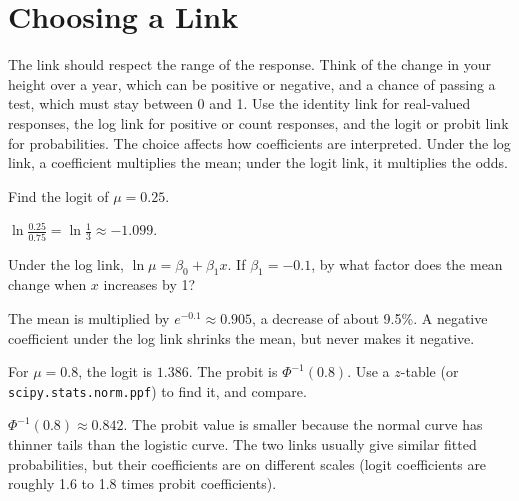 \section{Choosing a Link}
The link should respect the range of the response. Think of the change in your height over a year, which can be positive or negative, and a chance of passing a test, which must stay between 0 and 1. Use the identity link for real-valued responses, the log link for
positive or count responses, and the logit or probit link for probabilities. The choice affects how coefficients are
interpreted. Under the log link, a coefficient multiplies the mean; under the logit link, it multiplies the odds.

\begin{Exercise}[label=lf1, title=Logit value]
Find the logit of $\mu = 0.25$.
\end{Exercise}
\begin{Answer}[ref=lf1]
$\ln\frac{0.25}{0.75} = \ln\frac{1}{3} \approx -1.099$.
\end{Answer}

\begin{Exercise}[label=lf2, title=Interpret the log link]
Under the log link, $\ln\mu = \beta_0 + \beta_1 x$. If $\beta_1 = -0.1$, by what factor does the mean change when $x$ increases by 1?
\end{Exercise}
\begin{Answer}[ref=lf2]
The mean is multiplied by $e^{-0.1} \approx 0.905$, a decrease of about 9.5\%. A
negative coefficient under the log link shrinks the mean, but never makes it negative.
\end{Answer}

\begin{Exercise}[label=lf3, title=Logit versus probit]
For $\mu = 0.8$, the logit is $1.386$. The probit is $\Phi^{-1}(0.8)$. Use a
$z$-table (or \texttt{scipy.stats.norm.ppf}) to find it, and compare.
\end{Exercise}
\begin{Answer}[ref=lf3]
$\Phi^{-1}(0.8) \approx 0.842$. The probit value is smaller because the normal
curve has thinner tails than the logistic curve. The two links usually give
similar fitted probabilities, but their coefficients are on different scales
(logit coefficients are roughly 1.6 to 1.8 times probit coefficients).
\end{Answer}

